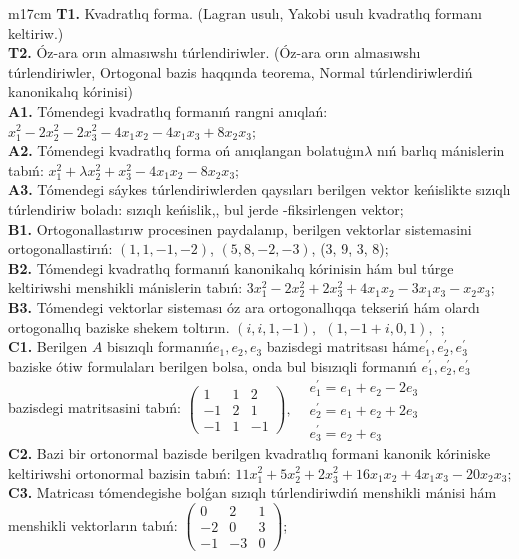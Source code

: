 \documentclass{article}
\begin{document}
\begin{tabular}{m{17cm}}
\textbf{T1.} Kvadratlıq forma. (Lagran usulı, Yakobi usulı kvadratlıq formanı keltiriw.) \\
\textbf{T2.} Óz-ara orın almasıwshı túrlendiriwler. (Óz-ara orın almasıwshı túrlendiriwler,  Ortogonal bazis haqqında teorema,  Normal túrlendiriwlerdiń kanonikalıq kórinisi) \\
\textbf{A1.} Tómendegi kvadratlıq formanıń rangni anıqlań: \(x_{1}^{2} - 2x_{2}^{2} - 2x_{3}^{2} - 4x_{1}x_{2} - 4x_{1}x_{3} + 8x_{2}x_{3}\); \\
\textbf{A2.} Tómendegi kvadratlıq forma oń anıqlangan bolatuģın\(\lambda\) nıń barlıq mánislerin tabıń: \(x_{1}^{2} + \lambda x_{2}^{2} + x_{3}^{2} - 4x_{1}x_{2} - 8x_{2}x_{3}\); \\
\textbf{A3.} Tómendegi sáykes túrlendiriwlerden qaysıları berilgen vektor keńislikte sızıqlı túrlendiriw boladı: sızıqlı keńislik,, bul jerde -fiksirlengen vektor; \\
\textbf{B1.} Ortogonallastırıw procesinen paydalanıp, berilgen vektorlar sistemasini ortogonallastirıń: \((1,1, - 1, - 2)\), \((5,8, - 2, - 3)\), (3, 9, 3, 8); \\
\textbf{B2.} Tómendegi kvadratlıq formanıń kanonikalıq kórinisin hám bul túrge keltiriwshi menshikli mánislerin tabıń: \(3x_{1}^{2} - 2x_{2}^{2} + 2x_{3}^{2} + 4x_{1}x_{2} - 3x_{1}x_{3} - x_{2}x_{3}\); \\
\textbf{B3.} Tómendegi vektorlar sisteması óz ara ortogonallıqqa tekseriń hám olardı ortogonallıq baziske shekem toltırın. \((i,i,1, - 1),\ \ (1, - 1 + i,0,1),\ \ \); \\
\textbf{C1.} Berilgen \(A\) bisızıqlı formanıń\(e_{1},e_{2},e_{3}\) bazisdegi matritsası hám\(e_{1}^{'},e_{2}^{'},e_{3}^{'}\) baziske ótiw formulaları berilgen bolsa, onda bul bisızıqli formanıń \(e_{1}^{'},e_{2}^{'},e_{3}^{'}\) bazisdegi matritsasini tabıń: \(\begin{pmatrix} 1 & 1 & 2 \\  - 1 & 2 & 1 \\  - 1 & 1 & - 1 \end{pmatrix},\begin{matrix}  & e_{1}^{'} = e_{1} + e_{2} - 2e_{3} \\  & e_{2}^{'} = e_{1} + e_{2} + 2e_{3} \\  & e_{3}^{'} = e_{2} + e_{3} \end{matrix}\) \\
\textbf{C2.} Bazi bir ortonormal bazisde berilgen kvadratlıq formani kanonik kóriniske keltiriwshi ortonormal bazisin tabıń: \(11x_{1}^{2} + 5x_{2}^{2} + 2x_{3}^{2} + 16x_{1}x_{2} + 4x_{1}x_{3} - 20x_{2}x_{3}\); \\
\textbf{C3.} Matricası tómendegishe bolǵan sızıqlı túrlendiriwdiń menshikli mánisi hám menshikli vektorların tabıń: \(\begin{pmatrix} 0 & 2 & 1 \\  - 2 & 0 & 3 \\  - 1 & - 3 & 0 \end{pmatrix}\); \\

\end{tabular}
\vspace{1cm}
\end{document}
